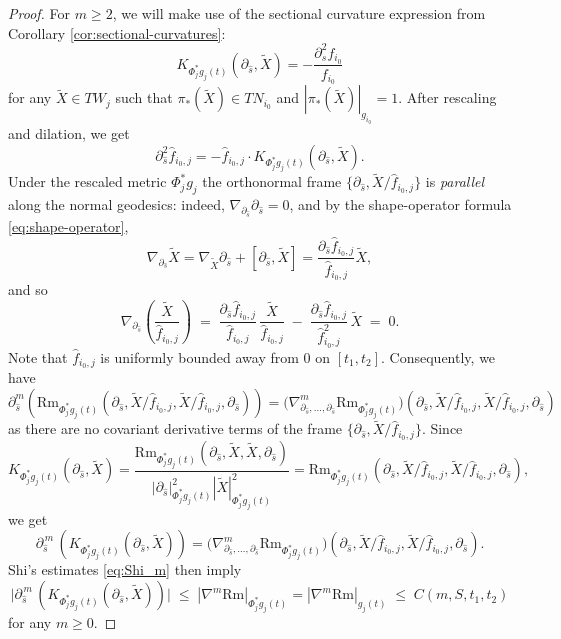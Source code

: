 \documentclass[11pt]{amsart}
\theoremstyle{plain}
\numberwithin{equation}{section}
\theoremstyle{definition}
\theoremstyle{remark}
\begin{document}
\begin{proof}
For $m \geq 2$, we will make use of the sectional curvature expression from Corollary \ref{cor:sectional-curvatures}:
\[K_{\Phi_j^*g_j(t)}(\partial_{\hat{s}}, \widetilde{X}) = -\frac{\partial_s^2 f_{i_0}}{f_{i_0}}\]
for any $\widetilde{X} \in TW_j$ such that $\pi_*(\widetilde{X}) \in TN_{i_0}$ and $|\pi_*(\widetilde{X})|_{g_{i_0}} = 1$. After rescaling and dilation, we get
\begin{equation}\label{eq:partial-f-K}
\partial^2_{\hat{s}}\hat{f}_{i_0,j} = -\hat{f}_{i_0,j} \cdot K_{\Phi_j^*g_j(t)}(\partial_{\hat{s}}, \widetilde{X}).	
\end{equation}
Under the rescaled metric $\Phi_j^*g_j$ the orthonormal frame $\{ \partial_{\hat{s}}, \widetilde{X} / \hat{f}_{i_0, j} \}$ is \emph{parallel} along the normal geodesics: indeed, $\nabla_{\partial_{\hat{s}}}\partial_{\hat{s}} = 0$, and by the shape-operator formula \eqref{eq:shape-operator},
\[\nabla_{\partial_{\hat{s}}}\widetilde{X} = \nabla_{\widetilde{X}}\partial_{\hat{s}} + [\partial_{\hat{s}}, \widetilde{X}] = \frac{\partial_{\hat{s}}\hat{f}_{i_0,j}}{\hat{f}_{i_0,j}}\widetilde{X},\]
and so
\begin{equation*}
\nabla_{\partial_{\hat{s}}} \left( \frac{\widetilde{X}}{\hat{f}_{i_0, j}} \right) \;=\; \frac{ \partial_{\hat{s}} \hat{f}_{i_0, j} }{ \hat{f}_{i_0, j} } \, \frac{\widetilde{X}}{\hat{f}_{i_0, j}} \;-\; \frac{ \partial_{\hat{s}} \hat{f}_{i_0, j} }{ \hat{f}_{i_0, j}^2 } \, \widetilde{X} \;=\; 0.
\end{equation*}
Note that $\hat{f}_{i_0, j}$ is uniformly bounded away from $0$ on $[t_1,t_2]$. Consequently, we have
\[\partial_{\hat{s}}^m \left(\textrm{Rm}_{\Phi_j^*g_j(t)}(\partial_{\hat s},\tilde X/\hat f_{i_0,j},\tilde X/\hat f_{i_0,j},\partial_{\hat s})\right) = \big(\nabla^m_{\partial_{\hat s},\dots,\partial_{\hat s}}\mathrm{Rm}_{\Phi_j^*g_j(t)}\big)(\partial_{\hat s},\tilde X/\hat f_{i_0,j},\tilde X/\hat f_{i_0,j},\partial_{\hat s})\]
as there are no covariant derivative terms of the frame $\{ \partial_{\hat{s}}, \widetilde{X} / \hat{f}_{i_0, j} \}$. Since
\[K_{\Phi_j^*g_j(t)}(\partial_{\hat{s}},\widetilde{X}) = \frac{\textrm{Rm}_{\Phi_j^*g_j(t)}(\partial_{\hat{s}}, \widetilde{X}, \widetilde{X}, \partial_{\hat{s}})}{|\partial_{\hat{s}}|^2_{\Phi_j^*g_j(t)}|\widetilde{X}|_{\Phi_j^*g_j(t)}^2} = \textrm{Rm}_{\Phi_j^*g_j(t)}(\partial_{\hat{s}}, \widetilde{X}/\hat{f}_{i_0,j}, \widetilde{X}/\hat{f}_{i_0,j}, \partial_{\hat{s}}),\]
we get
\[\partial_{\hat s}^{\,m}\,\left(K_{\Phi_j^*g_j(t)}(\partial_{\hat s},\widetilde{X})\right)=\big(\nabla^m_{\partial_{\hat s},\dots,\partial_{\hat s}}\mathrm{Rm}_{\Phi_j^*g_j(t)}\big)(\partial_{\hat s},\tilde X/\hat f_{i_0,j},\tilde X/\hat f_{i_0,j},\partial_{\hat s}).\]
Shi's estimates \eqref{eq:Shi_m} then imply
\begin{equation}\label{eq:partialk-K}
\big|\partial_{\hat s}^{\,m}\,(K_{\Phi_j^*g_j(t)}(\partial_{\hat s},\widetilde{X}))\big|\;\leq\;|\nabla^m\mathrm{Rm}|_{\Phi_j^*g_j(t)} = |\nabla^m\textrm{Rm}|_{g_j(t)}\;\leq\;C(m,S,t_1,t_2)
\end{equation}
for any $m \geq 0$.


\end{proof}
\end{document}
